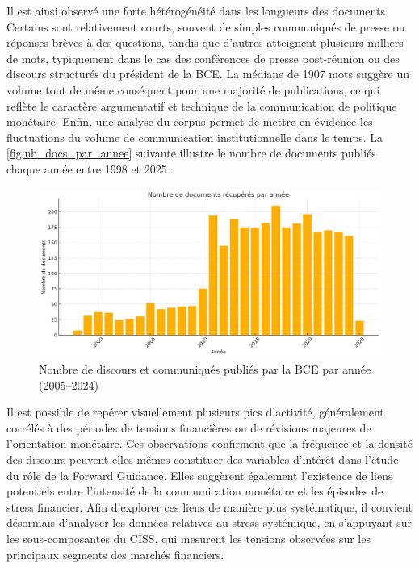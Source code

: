 Il est ainsi observé une forte hétérogénéité dans les longueurs des documents. Certains sont relativement courts, souvent de simples communiqués de presse ou réponses brèves à des questions, tandis que d'autres atteignent plusieurs milliers de mots, typiquement dans le cas des conférences de presse post-réunion ou des discours structurés du président de la BCE. La médiane de 1907 mots suggère un volume tout de même conséquent pour une majorité de publications, ce qui reflète le caractère argumentatif et technique de la communication de politique monétaire. Enfin, une analyse du corpus permet de mettre en évidence les fluctuations du volume de communication institutionnelle dans le temps. La \autoref{fig:nb_docs_par_annee} suivante illustre le nombre de documents publiés chaque année entre 1998 et 2025 :

\begin{figure}[H]
    \centering
    \includegraphics[width=0.9\linewidth]{images/docs_par_annee.png}
    \caption{Nombre de discours et communiqués publiés par la BCE par année (2005–2024)}
    \label{fig:nb_docs_par_annee}
\end{figure}

Il est possible de repérer visuellement plusieurs pics d’activité, généralement corrélés à des périodes de tensions financières ou de révisions majeures de l’orientation monétaire. Ces observations confirment que la fréquence et la densité des discours peuvent elles-mêmes constituer des variables d’intérêt dans l’étude du rôle de la Forward Guidance. Elles suggèrent également l’existence de liens potentiels entre l’intensité de la communication monétaire et les épisodes de stress financier. Afin d’explorer ces liens de manière plus systématique, il convient désormais d’analyser les données relatives au stress systémique, en s’appuyant sur les sous-composantes du CISS, qui mesurent les tensions observées sur les principaux segments des marchés financiers.


